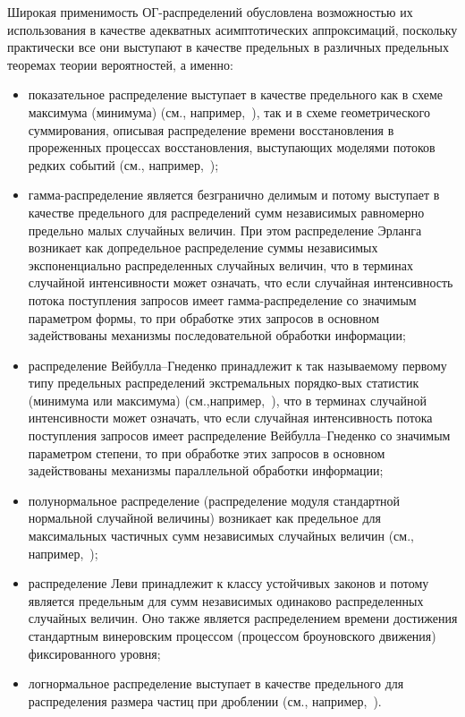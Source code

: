 \begin{multicols}{2}
Широкая применимость ОГ-распределений обусловлена возможностью их
использования в качестве адекватных асимптотических аппроксимаций,
поскольку практически все они выступают в качестве предельных в
различных предельных теоремах теории вероятностей, а именно:
\begin{itemize}
\item показательное распределение выступает в качестве предельного
как в схеме максимума (минимума) (см., например,~\cite{Gumbel1965}),
так и в схеме геометрического суммирования, описывая распределение
времени восстановления в прореженных процессах восстановления,
вы\-сту\-па\-ющих моделями потоков редких событий (см., например,~\cite{Kalashnikov1997});
\item гамма-распределение является безгранично делимым и потому
выступает в качестве предельного для распределений сумм независимых
равномер\-но предельно малых случайных величин. При этом распределение
Эрланга возникает как %
 допредельное распределение суммы независимых
экспоненциально распределенных случайных величин, что в терминах
случайной интенсивности может означать, что если случайная
интенсивность потока поступления запросов имеет гамма-распределение
со значимым параметром формы, то при обработке этих запросов в
основном задействованы механизмы последовательной обработки
информации;
\item распределение Вейбулла--Гне\-ден\-ко принадлежит к так
называемому первому типу предельных распределений экстремальных
порядко-\linebreak вых статистик (минимума или максимума) (см.,\linebreak  например,~\cite{Gumbel1965}), 
что в терминах случайной интенсивности может
означать, что если случайная интенсивность потока поступления
запросов имеет распределение Вей\-бул\-ла--Гне\-ден\-ко со значимым
параметром степени, то при обработке этих запросов в основном
задействованы механизмы параллельной обработки информации;
\item полунормальное распределение (распределение модуля
стандартной нормальной случайной величины) возникает как предельное
для максимальных частичных сумм независимых случайных величин (см.,
например,~\cite{KorolevSokolov2008});
\item распределение Леви принадлежит к классу устойчивых законов и
потому является предельным для сумм независимых одинаково
распределенных случайных величин. Оно также является распределением
времени достижения стандартным винеровским процессом (процессом
броуновского движения) фиксированного уровня;
\item логнормальное распределение выступает в качестве предельного
для распределения размера частиц при дроблении (см., например,~\cite{Korolev2009}).
\end{itemize}


\end{multicols}

